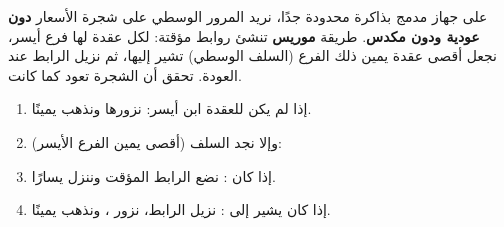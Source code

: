 \begin{statement}
على جهاز مدمج بذاكرة محدودة جدًا، نريد المرور الوسطي على شجرة الأسعار \textbf{دون عودية ودون مكدس}. طريقة \textbf{موريس} تنشئ روابط مؤقتة: لكل عقدة لها فرع أيسر، نجعل أقصى عقدة يمين ذلك الفرع (السلف الوسطي) تشير إليها، ثم نزيل الرابط عند العودة. تحقق أن الشجرة تعود كما كانت.
\end{statement}
\begin{stepsbox}\begin{enumerate}
\item إذا لم يكن للعقدة ابن أيسر: نزورها ونذهب يمينًا.
\item وإلا نجد السلف  (أقصى يمين الفرع الأيسر):
\item إذا كان : نضع الرابط المؤقت  وننزل يسارًا.
\item إذا كان يشير إلى : نزيل الرابط، نزور ، ونذهب يمينًا.
\end{enumerate}\end{stepsbox}

